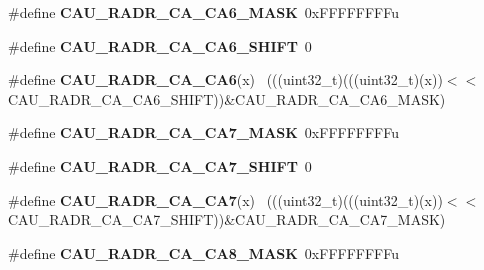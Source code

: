 \begin{DoxyCompactItemize}
\item 
\hypertarget{group___c_a_u___register___masks_gac15bff5a590f321f7edcc30599c9e060}{}\#define {\bfseries C\+A\+U\+\_\+\+R\+A\+D\+R\+\_\+\+C\+A\+\_\+\+C\+A6\+\_\+\+M\+A\+S\+K}~0x\+F\+F\+F\+F\+F\+F\+F\+Fu\label{group___c_a_u___register___masks_gac15bff5a590f321f7edcc30599c9e060}

\item 
\hypertarget{group___c_a_u___register___masks_ga93c9d65769c30135083c7aeb0300184f}{}\#define {\bfseries C\+A\+U\+\_\+\+R\+A\+D\+R\+\_\+\+C\+A\+\_\+\+C\+A6\+\_\+\+S\+H\+I\+F\+T}~0\label{group___c_a_u___register___masks_ga93c9d65769c30135083c7aeb0300184f}

\item 
\hypertarget{group___c_a_u___register___masks_ga8fc9b4b650748b1fc97cc05000800cc3}{}\#define {\bfseries C\+A\+U\+\_\+\+R\+A\+D\+R\+\_\+\+C\+A\+\_\+\+C\+A6}(x)                                          ~(((uint32\+\_\+t)(((uint32\+\_\+t)(x))$<$$<$C\+A\+U\+\_\+\+R\+A\+D\+R\+\_\+\+C\+A\+\_\+\+C\+A6\+\_\+\+S\+H\+I\+F\+T))\&C\+A\+U\+\_\+\+R\+A\+D\+R\+\_\+\+C\+A\+\_\+\+C\+A6\+\_\+\+M\+A\+S\+K)\label{group___c_a_u___register___masks_ga8fc9b4b650748b1fc97cc05000800cc3}

\item 
\hypertarget{group___c_a_u___register___masks_gab7bd0a8a36b9bfe8642f27d09b6d24f6}{}\#define {\bfseries C\+A\+U\+\_\+\+R\+A\+D\+R\+\_\+\+C\+A\+\_\+\+C\+A7\+\_\+\+M\+A\+S\+K}~0x\+F\+F\+F\+F\+F\+F\+F\+Fu\label{group___c_a_u___register___masks_gab7bd0a8a36b9bfe8642f27d09b6d24f6}

\item 
\hypertarget{group___c_a_u___register___masks_ga119c6fa0ada08c282b33b5585d32983c}{}\#define {\bfseries C\+A\+U\+\_\+\+R\+A\+D\+R\+\_\+\+C\+A\+\_\+\+C\+A7\+\_\+\+S\+H\+I\+F\+T}~0\label{group___c_a_u___register___masks_ga119c6fa0ada08c282b33b5585d32983c}

\item 
\hypertarget{group___c_a_u___register___masks_ga5c844259a8bedabb8fabc046de759de7}{}\#define {\bfseries C\+A\+U\+\_\+\+R\+A\+D\+R\+\_\+\+C\+A\+\_\+\+C\+A7}(x)                                          ~(((uint32\+\_\+t)(((uint32\+\_\+t)(x))$<$$<$C\+A\+U\+\_\+\+R\+A\+D\+R\+\_\+\+C\+A\+\_\+\+C\+A7\+\_\+\+S\+H\+I\+F\+T))\&C\+A\+U\+\_\+\+R\+A\+D\+R\+\_\+\+C\+A\+\_\+\+C\+A7\+\_\+\+M\+A\+S\+K)\label{group___c_a_u___register___masks_ga5c844259a8bedabb8fabc046de759de7}

\item 
\hypertarget{group___c_a_u___register___masks_ga0becdc994c7da7ab67251bd2da040493}{}\#define {\bfseries C\+A\+U\+\_\+\+R\+A\+D\+R\+\_\+\+C\+A\+\_\+\+C\+A8\+\_\+\+M\+A\+S\+K}~0x\+F\+F\+F\+F\+F\+F\+F\+Fu\label{group___c_a_u___register___masks_ga0becdc994c7da7ab67251bd2da040493}


\end{DoxyCompactItemize}
